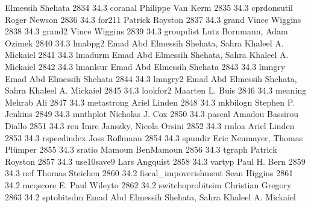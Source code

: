                                   Elmessih Shehata                        
  2834     34.3    coranal       Philippe Van Kerm                       
  2835     34.3    cprdonsutil   Roger Newson                            
  2836     34.3    for211        Patrick Royston                         
  2837     34.3    grand         Vince Wiggins                           
  2838     34.3    grand2        Vince Wiggins                           
  2839     34.3    groupdist     Lutz Bornmann, Adam Ozimek              
  2840     34.3    lmabpg2       Emad Abd Elmessih Shehata, Sahra        
                                   Khaleel A. Mickaiel                     
  2841     34.3    lmadurm       Emad Abd Elmessih Shehata, Sahra        
                                   Khaleel A. Mickaiel                     
  2842     34.3    lmanlsur      Emad Abd Elmessih Shehata               
  2843     34.3    lmngry        Emad Abd Elmessih Shehata               
  2844     34.3    lmngry2       Emad Abd Elmessih Shehata, Sahra        
                                   Khaleel A. Mickaiel                     
  2845     34.3    lookfor2      Maarten L. Buis                         
  2846     34.3    meaning       Mehrab Ali                              
  2847     34.3    metastrong    Ariel Linden                            
  2848     34.3    mkbilogn      Stephen P. Jenkins                      
  2849     34.3    mnthplot      Nicholas J. Cox                         
  2850     34.3    pascal        Amadou Bassirou Diallo                  
  2851     34.3    reu           Imre Janszky, Nicola Orsini             
  2852     34.3    rmloa         Ariel Linden                            
  2853     34.3    rspeedindex   Joss Roßmann                           
  2854     34.3    spundir       Eric Neumayer, Thomas Plümper          
  2855     34.3    sratio        Mamoun BenMamoun                        
  2856     34.3    tgraph        Patrick Royston                         
  2857     34.3    use10save9    Lars Angquist                           
  2858     34.3    vartyp        Paul H. Bern                            
  2859     34.3    ncf           Thomas Steichen                         
  2860     34.2    fiscal_impoverishment  Sean Higgins                            
  2861     34.2    mcqscore      E. Paul Wileyto                         
  2862     34.2    switchoprobitsim  Christian Gregory                       
  2863     34.2    sptobitsdm    Emad Abd Elmessih Shehata, Sahra        
                                   Khaleel A. Mickaiel                     
